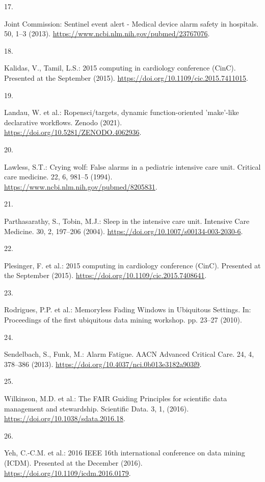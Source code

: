 \documentclass[
]{article}
\newlength{\cslhangindent}
\newlength{\csllabelwidth}
\newenvironment{CSLReferences}[2] %
 {%
  \setlength{\parindent}{0pt}
  \ifodd #1 \everypar{\setlength{\hangindent}{\cslhangindent}}\ignorespaces\fi
  \ifnum #2 > 0
  \setlength{\parskip}{#2\baselineskip}
  \fi
 }%
 {}
\newcommand{\CSLLeftMargin}[1]{\parbox[t]{\csllabelwidth}{#1}}
\newcommand{\CSLRightInline}[1]{\parbox[t]{\linewidth - \csllabelwidth}{#1}\break}
\begin{document}
\begin{CSLReferences}{0}{0}
\leavevmode{}%
\CSLLeftMargin{17. }
\CSLRightInline{Joint Commission: {Sentinel event alert - Medical device
alarm safety in hospitals.} 50, 1--3 (2013).
\url{https://www.ncbi.nlm.nih.gov/pubmed/23767076}.}

\leavevmode{}%
\CSLLeftMargin{18. }
\CSLRightInline{Kalidas, V., Tamil, L.S.: 2015 computing in cardiology
conference (CinC). Presented at the September (2015).
\url{https://doi.org/10.1109/cic.2015.7411015}.}

\leavevmode{}%
\CSLLeftMargin{19. }
\CSLRightInline{Landau, W. et al.: Ropensci/targets, dynamic
function-oriented 'make'-like declarative workflows. Zenodo (2021).
\url{https://doi.org/10.5281/ZENODO.4062936}.}

\leavevmode{}%
\CSLLeftMargin{20. }
\CSLRightInline{Lawless, S.T.: Crying wolf: False alarms in a pediatric
intensive care unit. Critical care medicine. 22, 6, 981--5 (1994).
\url{https://www.ncbi.nlm.nih.gov/pubmed/8205831}.}

\leavevmode{}%
\CSLLeftMargin{21. }
\CSLRightInline{Parthasarathy, S., Tobin, M.J.: Sleep in the intensive
care unit. Intensive Care Medicine. 30, 2, 197--206 (2004).
\url{https://doi.org/10.1007/s00134-003-2030-6}.}

\leavevmode{}%
\CSLLeftMargin{22. }
\CSLRightInline{Plesinger, F. et al.: 2015 computing in cardiology
conference (CinC). Presented at the September (2015).
\url{https://doi.org/10.1109/cic.2015.7408641}.}

\leavevmode{}%
\CSLLeftMargin{23. }
\CSLRightInline{Rodrigues, P.P. et al.: {Memoryless Fading Windows in
Ubiquitous Settings}. In: Proceedings of the first ubiquitous data
mining workshop. pp. 23--27 (2010).}

\leavevmode{}%
\CSLLeftMargin{24. }
\CSLRightInline{Sendelbach, S., Funk, M.: Alarm Fatigue. AACN Advanced
Critical Care. 24, 4, 378--386 (2013).
\url{https://doi.org/10.4037/nci.0b013e3182a903f9}.}

\leavevmode{}%
\CSLLeftMargin{25. }
\CSLRightInline{Wilkinson, M.D. et al.: The FAIR Guiding Principles for
scientific data management and stewardship. Scientific Data. 3, 1,
(2016). \url{https://doi.org/10.1038/sdata.2016.18}.}

\leavevmode{}%
\CSLLeftMargin{26. }
\CSLRightInline{Yeh, C.-C.M. et al.: 2016 IEEE 16th international
conference on data mining (ICDM). Presented at the December (2016).
\url{https://doi.org/10.1109/icdm.2016.0179}.}

\end{CSLReferences}
\end{document}
